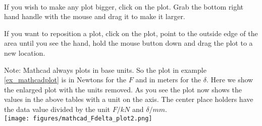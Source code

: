 \\

If you wish to make any plot bigger, click on the plot. Grab the bottom right hand
handle with the mouse and drag it to make it larger.

If you want to reposition a plot, click on the plot, point to the outside edge of the area
until you see the hand, hold the mouse button down and drag the plot to a new location.

Note: Mathcad always plots in base units. So the plot in example \ref{ex_mathcadplot} is in Newtons for the $F$
and in meters for the $\delta$. Here we show the enlarged plot with the units removed. As you see the
plot now shows the values in the above tables with a unit on the axis. The center place
holders have the data value divided by the unit $F/kN$ and $\delta/mm$.\\

\texttt{[image: figures/mathcad\_Fdelta\_plot2.png]}

